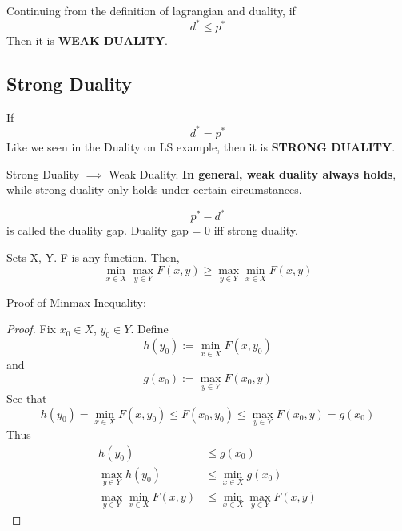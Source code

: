 \begin{definition}
	Continuing from the definition of lagrangian and duality, if
	\[
d^*\le p^*
	\]
	Then it is \textbf{WEAK DUALITY}.
\end{definition}


\subsection{Strong Duality} %
\label{sub:strong_duality}

\begin{definition}
	If
	\[
d^*= p^*
	\]
	Like we seen in the Duality on LS example, then it is \textbf{STRONG DUALITY}.
\end{definition}

\begin{remark}
	Strong Duality $\implies$ Weak Duality. \textbf{In general, weak duality always holds}, while strong duality only holds under certain circumstances.
\end{remark}

\begin{definition}
	\[
p^*-d^*
	\]
	is called the duality gap. Duality gap = 0 iff strong duality.
\end{definition}

\begin{theorem}
	Sets X, Y. F is any function. Then,
	\[
\min_{x\in X} \max_{y\in Y} F(x, y) \ge \max_{y\in Y} \min_{x\in X} F(x, y)
	\]
\end{theorem}
Proof of Minmax Inequality:
\begin{proof}
	Fix $x_0\in X$, $y_0\in Y$. Define
	\[
h(y_0) := \min_{x\in X}F(x, y_0)
	\]
	and
	\[
g(x_0) := \max_{y\in Y}F(x_0, y)
	\]
	See that
	\[
h(y_0) = \min_{x\in X}F(x, y_0) \le F(x_0, y_0) \le \max_{y\in Y}F(x_0, y) = g(x_0)
	\]
	Thus
	\begin{align*}
		h(y_0) &\le g(x_0) \\
		\max_{y\in Y} h(y_0) &\le \min_{x\in X}g(x_0)\\
		\max_{y\in Y} \min_{x\in X} F(x, y) &\le \min_{x\in X} \max_{y\in Y} F(x, y)
	\end{align*}
\end{proof}

